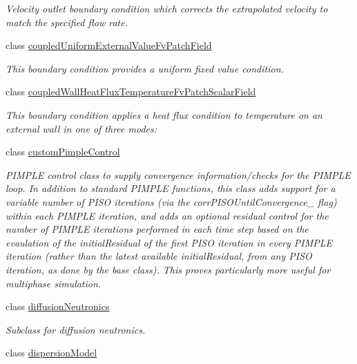 \begin{DoxyCompactItemize}
\begin{DoxyCompactList}\small\item\em Velocity outlet boundary condition which corrects the extrapolated velocity to match the specified flow rate. \end{DoxyCompactList}\item 
class \hyperlink{classFoam_1_1coupledUniformExternalValueFvPatchField}{coupled\+Uniform\+External\+Value\+Fv\+Patch\+Field}
\begin{DoxyCompactList}\small\item\em This boundary condition provides a uniform fixed value condition. \end{DoxyCompactList}\item 
class \hyperlink{classFoam_1_1coupledWallHeatFluxTemperatureFvPatchScalarField}{coupled\+Wall\+Heat\+Flux\+Temperature\+Fv\+Patch\+Scalar\+Field}
\begin{DoxyCompactList}\small\item\em This boundary condition applies a heat flux condition to temperature on an external wall in one of three modes\+: \end{DoxyCompactList}\item 
class \hyperlink{classFoam_1_1customPimpleControl}{custom\+Pimple\+Control}
\begin{DoxyCompactList}\small\item\em P\+I\+M\+P\+LE control class to supply convergence information/checks for the P\+I\+M\+P\+LE loop. In addition to standard P\+I\+M\+P\+LE functions, this class adds support for a variable number of P\+I\+SO iterations (via the corr\+P\+I\+S\+O\+Until\+Convergence\+\_\+ flag) within each P\+I\+M\+P\+LE iteration, and adds an optional residual control for the number of P\+I\+M\+P\+LE iterations performed in each time step based on the evaulation of the initial\+Residual of the first P\+I\+SO iteration in every P\+I\+M\+P\+LE iteration (rather than the latest available initial\+Residual, from any P\+I\+SO iteration, as done by the base class). This proves particularly more useful for multiphase simulation. \end{DoxyCompactList}\item 
class \hyperlink{classFoam_1_1diffusionNeutronics}{diffusion\+Neutronics}
\begin{DoxyCompactList}\small\item\em Subclass for diffusion neutronics. \end{DoxyCompactList}\item 
class \hyperlink{classFoam_1_1dispersionModel}{dispersion\+Model}

\end{DoxyCompactItemize}
